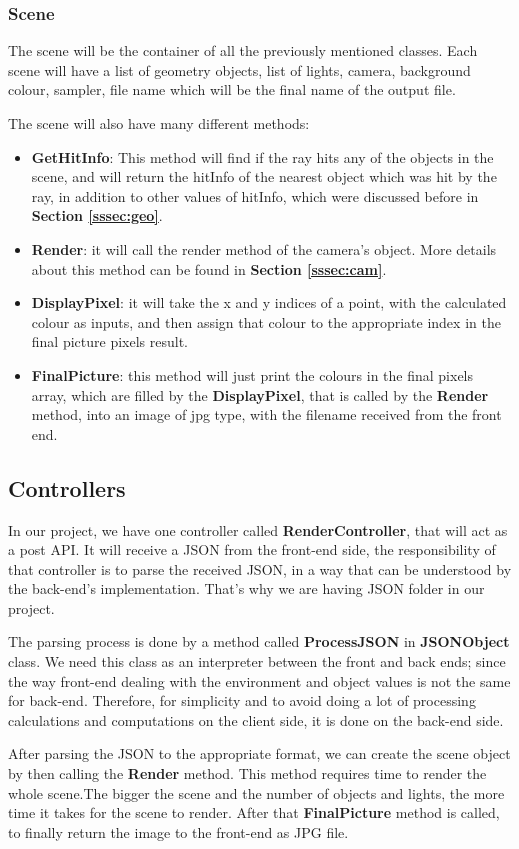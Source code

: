 \documentclass[a4paper]{report}
\begin{document}
	\subsubsection{Scene}
	The scene will be the container of all the previously mentioned classes. Each scene will have a list of geometry objects, list of lights, camera, background colour, sampler, file name which will be the final name of the output file.\newline
	\par The scene will also have many different methods:
	\begin{itemize}
		\item \textbf{GetHitInfo}: This method will find if the ray hits any of the objects in the scene, and will return the hitInfo of the nearest object which was hit by the ray, in addition to other values of hitInfo, which were discussed before in \textbf{Section \ref{sssec:geo}}.
		\item \textbf{Render}: it will call the render method of the camera's object. More details about this method can be found in \textbf{Section \ref{sssec:cam}}.
		\item \textbf{DisplayPixel}: it will take the x and y indices of a point, with the calculated colour as inputs, and then assign that colour to the appropriate index in the final picture pixels result.
		\item \textbf{FinalPicture}: this method will just print the colours in the final pixels array, which are filled by the \textbf{DisplayPixel}, that is called by the \textbf{Render} method, into an image of jpg type, with the filename received from the front end.
	\end{itemize}
	\subsection{Controllers}
	In our project, we have one controller called \textbf{RenderController}, that will act as a post API. It will receive a JSON from the front-end side, the responsibility of that controller is to parse the received JSON, in a way that can be understood by the back-end's implementation. That's why we are having JSON folder in our project.\newline
	\par The parsing process is done by a method called \textbf{ProcessJSON} in \textbf{JSONObject} class. We need this class as an interpreter between the front and back ends; since the way front-end dealing with the environment and object values is not the same for back-end. Therefore, for simplicity and to avoid doing a lot of processing calculations and computations on the client side, it is done on the back-end side.\newline
	\par After parsing the JSON to the appropriate format, we can create the scene object by then calling the \textbf{Render} method. This method requires time to render the whole scene.The bigger the scene and the number of objects and lights, the more time it takes for the scene to render. After that \textbf{FinalPicture} method is called, to finally return the image to the front-end as JPG file.
	
\end{document}
